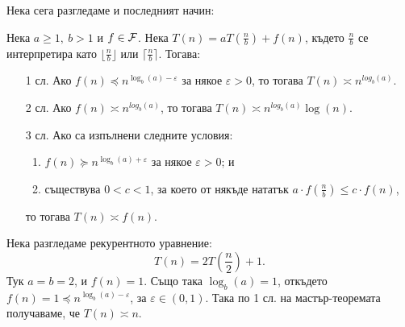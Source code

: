 Нека сега разгледаме и последният начин:
\begin{theorem}
    Нека $a \geq 1, \: b > 1$ и $f \in \mathcal{F}$.
    Нека $T(n) = aT(\frac{n}{b}) + f(n)$, където $\frac{n}{b}$ се интерпретира като $\lfloor \frac{n}{b} \rfloor$ или $\lceil \frac{n}{b} \rceil$.
    Тогава:
    \begin{itemize}
        \item[1 сл.] Ако $f(n) \preceq n^{\log_b(a) - \varepsilon}$ за някое $\varepsilon > 0$, то тогава $T(n) \asymp n^{log_b(a)}$.
        \item[2 сл.] Ако $f(n) \asymp n^{log_b(a)}$, то тогава $T(n) \asymp n^{log_b(a)} \log(n)$.
        \item[3 сл.] Ако са изпълнени следните условия:
              \begin{enumerate}
                  \item $f(n) \succeq n^{\log_b(a) + \varepsilon}$ за някое $\varepsilon > 0$; и
                  \item съществува $0 < c < 1$, за което от някъде нататък $a \cdot f(\frac{n}{b}) \leq c \cdot f(n)$,
              \end{enumerate}
              то тогава $T(n) \asymp f(n)$.
    \end{itemize}
\end{theorem}

Нека разгледаме рекурентното уравнение:
\[
    T(n) = 2T(\frac{n}{2}) + 1.
\]
Тук $a = b = 2$, и $f(n) = 1$.
Също така $\log_b(a) = 1$, откъдето $f(n) = 1 \preceq n^{\log_b(a) - \varepsilon}$, за $\varepsilon \in (0, 1)$.
Така по 1 сл. на мастър-теоремата получаваме, че $T(n) \asymp n$.